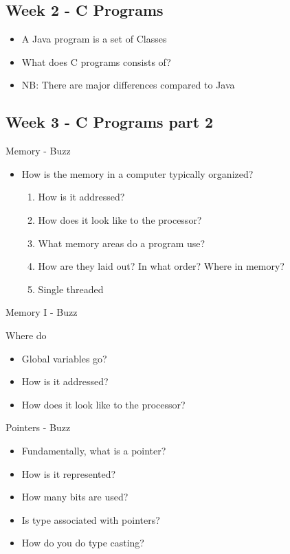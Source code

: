 
\subsection*{Week 2 - C Programs}
\begin{itemize}
\item A Java program is a set of Classes
\item What does C programs consists of?
\item NB: There are major differences compared to Java
\end{itemize}


\subsection*{Week 3 - C Programs part 2}

Memory - Buzz

\begin{itemize}
\item How is the memory in a computer typically organized?
  \begin{enumerate}
    \item How is it addressed?
    \item How does it look like to the processor?
    \item What memory areas do a program use?
    \item How are they laid out? In what order? Where in memory?
    \item Single threaded

  \end{enumerate}
\end{itemize}

Memory I - Buzz

Where do
\begin{itemize}
\item Global variables go?
\item How is it addressed?
\item How does it look like to the processor?
\end{itemize}

Pointers - Buzz

\begin{itemize}
\item Fundamentally, what is a pointer?
\item How is it represented?
\item How many bits are used?
\item Is type associated with pointers?
\item How do you do type casting?
\end{itemize}

